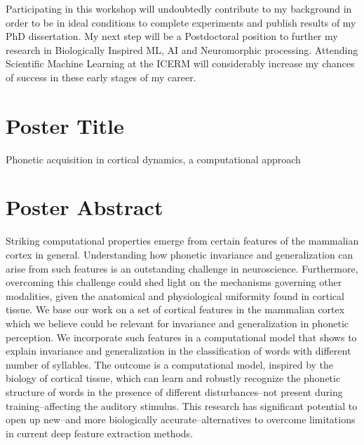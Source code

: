 \documentclass{article}
\begin{document}
Participating in this workshop will undoubtedly contribute to my background in order to be in ideal conditions to
complete experiments and publish results of my PhD dissertation. My next step will be a Postdoctoral position to
further my research in Biologically Inspired ML, AI and Neuromorphic processing.
Attending Scientific Machine Learning at the ICERM will considerably increase
my chances of success in these early stages of my career.









\section*{Poster Title}

Phonetic acquisition in cortical dynamics, a computational approach 

\section*{Poster Abstract}

Striking computational properties emerge from certain features of the mammalian
cortex in general. Understanding how phonetic invariance and generalization can arise
from such features is an outstanding challenge in neuroscience. Furthermore,
overcoming this challenge could shed light on the mechanisms governing other
modalities, given the anatomical and physiological uniformity found in cortical tissue.
We base our work on a set of cortical features in the mammalian cortex which we
believe could be relevant for invariance and generalization in phonetic perception. We
incorporate such features in a computational model that shows to explain invariance
and generalization in the classification of words with different number of syllables. The
outcome is a computational model, inspired by the biology of cortical tissue, which can
learn and robustly recognize the phonetic structure of words in the presence of different
disturbances–not present during training–affecting the auditory stimulus. This research
has significant potential to open up new–and more biologically accurate–alternatives to
overcome limitations in current deep feature extraction methods.
\end{document}
